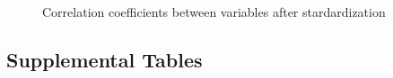 \documentclass[
  number,
  preprint,
  3p,
  onecolumn]{elsarticle}
\begin{document}
\begin{figure}


\caption{\label{fig-corr}Correlation coefficients between variables
after stardardization}

\end{figure}%

\subsection{Supplemental Tables}\label{supplemental-tables}
\end{document}

